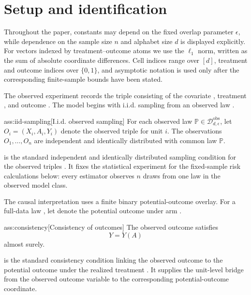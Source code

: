 \section{Setup and identification}

Throughout the paper, constants may depend on the fixed overlap parameter \(\epsilon\), while dependence on the sample size \(n\) and alphabet size \(d\) is displayed explicitly. For vectors indexed by treatment--outcome atoms we use the \(\ell_1\) norm, written as the sum of absolute coordinate differences. Cell indices range over \([d]\), treatment and outcome indices over \(\{0,1\}\), and asymptotic notation is used only after the corresponding finite-sample bounds have been stated.

The observed experiment records the triple  consisting of the covariate , treatment , and outcome . The model begins with i.i.d. sampling from an observed law .

\begin{assumptionv}{ass:iid-sampling}[I.i.d. observed sampling]
For each observed law \(\mathbb P\in\mathcal D_{d,\epsilon}^{\mathrm{obs}}\), let \(O_i=(X_i,A_i,Y_i)\) denote the observed triple for unit \(i\). The observations \(O_1,\ldots,O_n\) are independent and identically distributed with common law \(\mathbb P\).
\end{assumptionv}

 is the standard independent and identically distributed sampling condition for the observed triples \citep{ZengBalakrishnanHanKennedy2024Discrete}. It fixes the statistical experiment for the fixed-sample risk calculations below: every estimator observes \(n\) draws from one law in the observed model class.

The causal interpretation uses a finite binary potential-outcome overlay. For a full-data law , let  denote the potential outcome under arm .

\begin{assumptionv}{ass:consistency}[Consistency of outcomes]
The observed outcome satisfies
\[
Y=Y(A)
\]
almost surely.
\end{assumptionv}

 is the standard consistency condition linking the observed outcome to the potential outcome under the realized treatment \citep{ZengBalakrishnanHanKennedy2024Discrete}. It supplies the unit-level bridge from the observed outcome variable to the corresponding potential-outcome coordinate.

